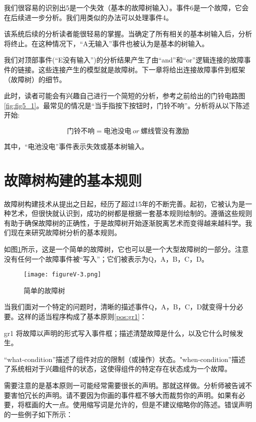 \documentclass[cn,11pt,chinese]{elegantbook}
\begin{document}
我们很容易的识别出5是一个失效（基本的故障树输入）。事件6是一个故障，它会在后续进一步分析。我们用类似的办法可以处理事件4。

该系统后续的分析读者能很轻易的掌握。当确定了所有相关的基本树输入后，分析将终止。在这种情况下，“A无输入”事件也被认为是基本的树输入。

我们对顶部事件(“E没有输入”)的分析结果产生了由“and”和“or”逻辑连接的故障事件的链接。这些连接产生的模型就是故障树。下一章将给出连接故障事件到框架（故障树）的细节。

此时，读者可能会有兴趣自己进行一个简短的分析，参考之前给出的门铃电路图\ref{fig:fig5_1}。最常见的情况是“当手指按下按钮时，门铃不响”。分析将从以下陈述开始:

 $$ \mbox{门铃不响} = \mbox{电池没电} \ or \ \mbox{螺线管没有激励}$$
 
 其中，“电池没电”事件表示失效或基本树输入。
 
 \section{故障树构建的基本规则}
 
 故障树构建技术从提出之日起，经历了超过15年的不断完善。起初，它被认为是一种艺术，但很快就认识到，成功的树都是根据一套基本规则绘制的。遵循这些规则有助于确保故障树的正确性，于是故障树开始逐渐脱离艺术而变得越来越科学。我们现在来研究故障树分析的基本规则。
 
 如图\ref{fig:fig5_3}所示，这是一个简单的故障树，它也可以是一个大型故障树的一部分。注意没有任何一个故障事件被“写入”；它们被表示为Q，A，B，C，D。
 
 \begin{figure}[h]
 	\centering
 	\texttt{[image: figureV-3.png]}
 	\caption{简单的故障树}\label{fig:fig5_3}
 \end{figure}
 
 当我们面对一个特定的问题时，清晰的描述事件Q，A，B，C，D就变得十分必要。这样的适当程序构成了基本原则\ref{pos:gr1}：
 
\begin{postulate}{}{gr1}
将故障以声明的形式写入事件框；描述清楚故障是什么，以及它什么时候发生。
\end{postulate}


“what-condition”描述了组件对应的限制（或操作）状态。"when-condition”描述了系统相对于兴趣组件的状态，这使得组件的特定存在状态成为一个故障。

需要注意的是基本原则一可能经常需要很长的声明。那就这样做。分析师被告诫不要害怕冗长的声明。请不要因为你画的事件框不够大而裁剪你的声明。如果有必要，将框画的大一点。使用缩写词是允许的，但是不建议缩略你的陈述。错误声明的一些例子如下所示：
\end{document}
